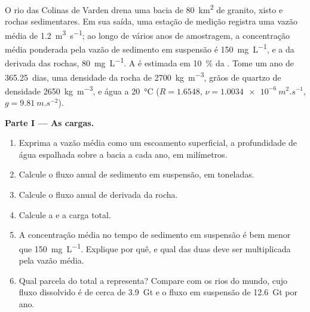 \begin{problem}
\label{pb:b1:erosion-transport:1}
O rio das Colinas de Varden drena uma bacia de \qty{80}{km^2} de granito, xisto e rochas sedimentares. Em sua saída, uma estação de medição registra uma vazão média de \qty{1.2}{m^3.s^{-1}}; ao longo de vários anos de amostragem, a concentração média ponderada pela vazão de sedimento em suspensão é \qty{150}{mg.L^{-1}}, e a da  derivada das rochas, \qty{80}{mg.L^{-1}}. A  é estimada em \qty{10}{\percent} da . Tome um ano de \num{365.25}~dias, uma densidade da rocha de \qty{2700}{kg.m^{-3}}, grãos de quartzo de densidade \qty{2650}{kg.m^{-3}}, e água a \qty{20}{\celsius} ($R
= 1.6548$, $\nu = \qty{1.0034e-6}{m^2.s^{-1}}$, $g = \qty{9.81}{m.s^{-2}}$).

\medskip
\noindent\textbf{Parte I --- As cargas.}
\begin{enumerate}
  \item Exprima a vazão média como um escoamento superficial, a profundidade de água espalhada sobre a bacia a cada ano, em milímetros.
  \item Calcule o fluxo anual de sedimento em suspensão, em toneladas.
  \item Calcule o fluxo anual de  derivada da rocha.
  \item Calcule a  e a carga total.
  \item A concentração média no tempo de sedimento em suspensão é bem menor que \qty{150}{mg.L^{-1}}. Explique por quê, e qual das duas deve ser multiplicada pela vazão média.
  \item Qual parcela do total a  representa? Compare com os rios do mundo, cujo fluxo dissolvido é de cerca de \qty{3.9}{Gt} e o fluxo em suspensão de \qty{12.6}{Gt} por ano.
\end{enumerate}


\end{problem}
